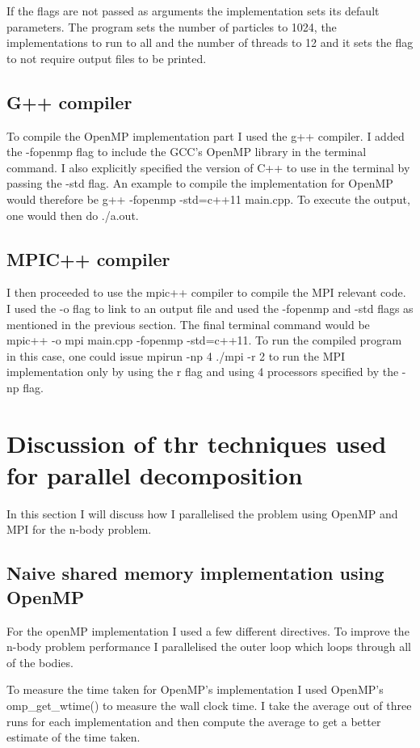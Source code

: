 \documentclass[12pt]{IEEEtran}
\begin{document}
If the flags are not passed as arguments the implementation  sets its default parameters. The program sets the number of particles to 1024, the implementations to run to all and the number of threads to 12 and it sets the flag to not require output files to be printed.

\subsection{G++ compiler}
To compile the OpenMP implementation part I used the g++ compiler. I added the -fopenmp flag to include the GCC's OpenMP library in the terminal command. I also explicitly specified the version of C++ to use in the terminal by passing the -std flag. An example to compile the implementation for OpenMP would therefore be g++ -fopenmp -std=c++11 main.cpp. To execute the output, one would then do ./a.out.

\subsection{MPIC++ compiler}
I then proceeded to use the mpic++ compiler to compile the MPI relevant code. I used the -o flag to link to an output file and used the -fopenmp and -std flags as mentioned in the previous section. The final terminal command would be mpic++ -o mpi main.cpp -fopenmp -std=c++11. To run the compiled program in this case, one could issue mpirun -np 4 ./mpi -r 2 to run the MPI implementation only by using the r flag and using 4 processors specified by the -np flag.

\section{Discussion of thr techniques used for parallel decomposition}
In this section I will discuss how I parallelised the problem using OpenMP and MPI for the n-body problem.

\subsection{Naive shared memory implementation using OpenMP}
For the openMP implementation I used a few different directives. To improve the n-body problem performance I parallelised the outer loop which loops through all of the bodies. 
\medskip

To measure the time taken for OpenMP's implementation I used OpenMP's omp\_get\_wtime() to measure the wall clock time. I take the average out of three runs for each implementation and then compute the average to get a better estimate of the time taken.
\medskip
\end{document}
